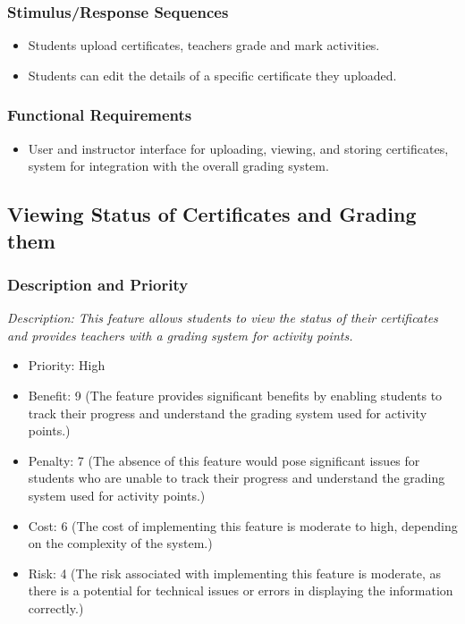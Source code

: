 \documentclass{article}
\begin{document}
\subsubsection{Stimulus/Response Sequences}
\begin{itemize}
  \item Students upload certificates, teachers grade and mark activities.
  \item Students can edit the details of a specific certificate they uploaded.
\end{itemize}

\subsubsection{Functional Requirements}
\begin{itemize}
\item User and instructor interface for uploading, viewing, and storing certificates, system for integration with the overall grading system.
\end{itemize}




\subsection{Viewing Status of Certificates and Grading them}
\subsubsection{Description and Priority}
\emph{Description: This feature allows students to view the status of their certificates and provides teachers with a grading system for activity points.}
\begin{itemize}
  \item Priority: High
  \item Benefit: 9 (The feature provides significant benefits by enabling students to track their progress and understand the grading system used for activity points.)
  \item Penalty: 7 (The absence of this feature would pose significant issues for students who are unable to track their progress and understand the grading system used for activity points.)
  \item Cost: 6 (The cost of implementing this feature is moderate to high, depending on the complexity of the system.)
  \item Risk: 4 (The risk associated with implementing this feature is moderate, as there is a potential for technical issues or errors in displaying the information correctly.)
\end{itemize}
\end{document}
